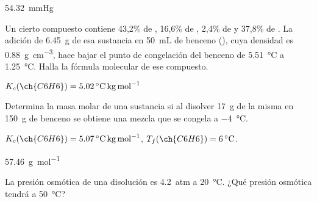 \begin{solution}
  \SI{54.32}{\mmHg}
\end{solution}




\begin{exercise}[
    tags    = {termodinámica, entalpía, entalpia de reacción, calor},
    topics  = {química, termoquímica, termodinámica},
    source  = {FQ 1B OXF 2015, p79, e46},
  ]
  Un cierto compuesto contiene 43,2\% de , 16,6\% de , 2,4\% de  y 37,8\% de . La adición de \SI{6.45}{\gram} de esa sustancia en \SI{50}{\milli\liter} de benceno (), cuya densidad es \SI{0.88}{\gram\per\cubic\centi\meter}, hace bajar el punto de congelación del benceno de \SI{5.51}{\celsius} a \SI{1.25}{\celsius}. Halla la fórmula molecular de ese compuesto.

  \begin{gexdatos}
    \( K_c (\ch{C6H6}) = \SI{5.02}{\celsius\kilo\gram\per\mole} \)
  \end{gexdatos}
\end{exercise}

\begin{solution}
\end{solution}



\begin{exercise}[
    tags    = {termodinámica, entalpía, entalpia de reacción, calor},
    topics  = {química, termoquímica, termodinámica},
    source  = {FQ 1B SAN 2015, p94, e54},
  ]
  Determina la masa molar de una sustancia si al disolver \SI{17}{\gram} de la misma en \SI{150}{\gram} de benceno se obtiene una mezcla que se congela a \SI{-4}{\celsius}.

  \begin{gexdatos}
    \( K_c (\ch{C6H6}) = \SI{5.07}{\celsius\kilo\gram\per\mole} \),
    \( T_f (\ch{C6H6}) = \SI{6}{\celsius} \).
  \end{gexdatos}
\end{exercise}

\begin{solution}
  \SI{57.46}{\gram\per\mole}
\end{solution}




\begin{exercise}[
    tags    = {termodinámica, entalpía, entalpia de reacción, calor},
    topics  = {química, termoquímica, termodinámica},
    source  = {FQ 1B OXF 2015, p79, e48},
  ]
  La presión osmótica de una disolución es \SI{4.2}{atm} a \SI{20}{\celsius}. ¿Qué presión osmótica tendrá a \SI{50}{\celsius}?
\end{exercise}


